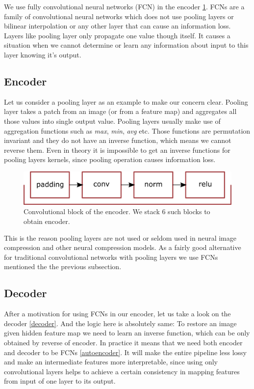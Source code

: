 We use fully convolutional neural networks (FCN) in the encoder \ref{encoder}. FCNs are a family of convolutional neural networks which does not use pooling layers or bilinear interpolation or any other layer that can cause an information loss. Layers like pooling layer only propagate one value though itself. It causes a situation when we cannot determine or learn any information about input to this layer knowing it's output.

\subsection{Encoder}

Let us consider a pooling layer as an example to make our concern clear. Pooling layer takes a patch from an image (or from a feature map) and aggregates all those values into single output value. Pooling layers usually make use of aggregation functions such as \textit{max}, \textit{min}, \textit{avg} etc. Those functions are permutation invariant and they do not have an inverse function, which means we cannot reverse them. Even in theory it is impossible to get an inverse functions for pooling layers kernels, since pooling operation causes information loss.

\begin{figure}[!ht]
    \centering
    \includegraphics[width=\textwidth]{figure/encoder.png}
    \caption{Convolutional block of the encoder. We stack 6 such blocks to obtain encoder.}
    \label{encoder}
\end{figure}

This is the reason pooling layers are not used or seldom used in neural image compression and other neural compression models. As a fairly good alternative for traditional convolutional networks with pooling layers we use FCNs mentioned the the previous subsection.

\subsection{Decoder}

After a motivation for using FCNs in our encoder, let us take a look on the decoder \ref{decoder}. And the logic here is absolutely same: To restore an image given hidden feature map we need to learn an inverse function, which can be only obtained by reverse of encoder. In practice it means that we need both encoder and decoder to be FCNs \ref{autoencoder}. It will make the entire pipeline less lossy and make an intermediate features more interpretable, since using only convolutional layers helps to achieve a certain consistency in mapping features from input of one layer to its output.

